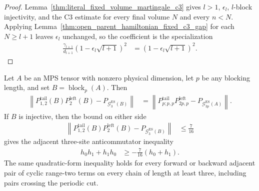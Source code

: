 \begin{proof}
    \leanok
    Lemma~\ref{thm:literal_fixed_volume_martingale_c3} gives $l>1$,
    $\epsilon_l$, $l$-block injectivity, and the C3 estimate for every final
    volume $N$ and every $n<N$.  Applying
    Lemma~\ref{thm:open_parent_hamiltonian_fixed_c3_gap} for each
    $N\geq l+1$ leaves $\epsilon_l$ unchanged, so the coefficient
    is the specialization
    \begin{align}
        \frac{\gamma_{l+1}}{d_{l+1}}
        \left(1-\epsilon_l\sqrt{l+1}\right)^2
         & =\left(1-\epsilon_l\sqrt{l+1}\right)^2.
    \end{align}
\end{proof}

\begin{lemma}
    \label{lem:blocked_to_cyclic_ground_projector_comparison}
    \leanok
    Let $A$ be an MPS tensor with nonzero physical dimension, let $p$ be any
    blocking length, and set $B=\operatorname{block}_p(A)$.  Then
    \begin{align}
        \left\lVert
        P^{\mathrm{tail}}_{1,2}(B)P^{\mathrm{left}}_2(B)
        -P_{\mathcal G_3^{\mathrm{ES}}(B)}
        \right\rVert
         & =\left\lVert
        P^{\mathrm{tail}}_{p;p,p}P^{\mathrm{left}}_{2p,p}
        -P_{\mathcal G_{3p}^{\mathrm{ES}}(A)}
        \right\rVert.
    \end{align}
    If $B$ is injective, then the bound on either side
    \begin{align}
        \left\lVert
        P^{\mathrm{tail}}_{1,2}(B)P^{\mathrm{left}}_2(B)
        -P_{\mathcal G_3^{\mathrm{ES}}(B)}
        \right\rVert
         & \leq \frac{7}{16}
    \end{align}
    gives the adjacent three-site anticommutator inequality
    \begin{align}
        h_0h_1+h_1h_0 & \geq-\frac{7}{16}(h_0+h_1).
    \end{align}
    The same quadratic-form inequality holds for every forward or backward
    adjacent pair of cyclic range-two terms on every chain of length at least
    three, including pairs crossing the periodic cut.
\end{lemma}

